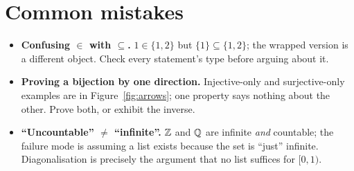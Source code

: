 \section{Common mistakes}
\begin{itemize}
\item \textbf{Confusing $\in$ with $\subseteq$.} $1 \in \{1,2\}$ but
$\{1\} \subseteq \{1,2\}$; the wrapped version is a different object.
Check every statement's type before arguing about it.
\item \textbf{Proving a bijection by one direction.} Injective-only and
surjective-only examples are in Figure~\ref{fig:arrows}; one property says
nothing about the other. Prove both, or exhibit the inverse.
\item \textbf{``Uncountable'' $\neq$ ``infinite''.} $\mathbb{Z}$ and $\mathbb{Q}$ are infinite
\emph{and} countable; the failure mode is assuming a list exists because the
set is ``just'' infinite. Diagonalisation is precisely the argument that no
list suffices for $[0,1)$.
\end{itemize}

